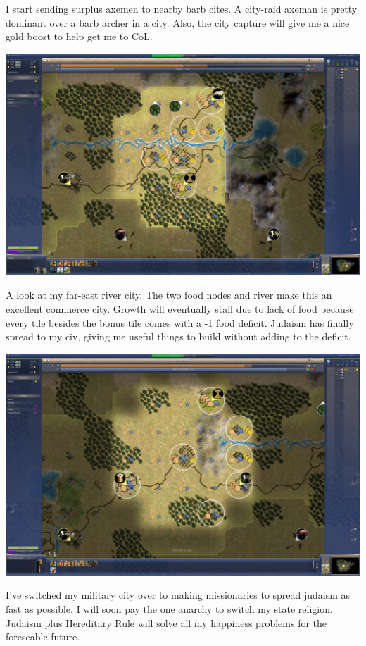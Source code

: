 \documentclass[10pt]{article}
\begin{document}
I start sending surplus axemen to nearby barb cites. A city-raid axeman is pretty dominant over a barb archer in
a city. Also, the city capture will give me a nice gold boost to help get me to CoL.

\includegraphics[width=1.0\textwidth]{88}

A look at my far-east river city. The two food nodes and river make this an excellent commerce city. Growth will
eventually stall due to lack of food because every tile besides the bonus tile comes with a -1 food deficit.
Judaism has finally spread to my civ, giving me useful things to build without adding to the deficit.

\includegraphics[width=1.0\textwidth]{89}

I've switched my military city over to making missionaries to spread judaism as fast as possible. I will soon
pay the one anarchy to switch my state religion. Judaism plus Hereditary Rule will solve all my happiness problems
for the foreseable future.
\end{document}
